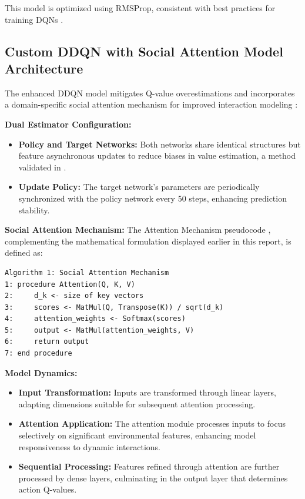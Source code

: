 \documentclass{article}
\begin{document}
This model is optimized using RMSProp, consistent with best practices for training DQNs \citep{mnih2015humanlevel}.

\subsection{Custom DDQN with Social Attention Model Architecture}
The enhanced DDQN model mitigates Q-value overestimations and incorporates a domain-specific social attention mechanism for improved interaction modeling \citep{leurent2019social}:

\textbf{Dual Estimator Configuration:}
\begin{itemize}
    \item \textbf{Policy and Target Networks:} Both networks share identical structures but feature asynchronous updates to reduce biases in value estimation, a method validated in \citep{DBLP:journals/corr/HasseltGS15}.
    \item \textbf{Update Policy:} The target network's parameters are periodically synchronized with the policy network every 50 steps, enhancing prediction stability.
\end{itemize}

\textbf{Social Attention Mechanism:}
The Attention Mechanism pseudocode \citep{DBLP:journals/corr/VaswaniSPUJGKP17}, complementing the mathematical formulation displayed earlier in this report, is defined as:

\begin{verbatim}
Algorithm 1: Social Attention Mechanism
1: procedure Attention(Q, K, V)
2:     d_k <- size of key vectors
3:     scores <- MatMul(Q, Transpose(K)) / sqrt(d_k)
4:     attention_weights <- Softmax(scores)
5:     output <- MatMul(attention_weights, V)
6:     return output
7: end procedure
\end{verbatim}

\textbf{Model Dynamics:}
\begin{itemize}
    \item \textbf{Input Transformation:} Inputs are transformed through linear layers, adapting dimensions suitable for subsequent attention processing.
    \item \textbf{Attention Application:} The attention module processes inputs to focus selectively on significant environmental features, enhancing model responsiveness to dynamic interactions.
    \item \textbf{Sequential Processing:} Features refined through attention are further processed by dense layers, culminating in the output layer that determines action Q-values.
\end{itemize}
\end{document}
